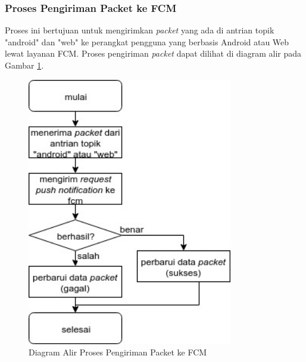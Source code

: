 \subsubsection{Proses Pengiriman Packet ke FCM}
\par Proses ini bertujuan untuk mengirimkan \textit{packet} yang ada di antrian topik "android" dan "web" ke perangkat pengguna yang berbasis Android atau Web lewat layanan FCM. Proses pengiriman \textit{packet} dapat dilihat di diagram alir pada Gambar \ref{flowchart_pengiriman_packet_ke_fcm}.
\begin{figure}[H]
	\centering\includegraphics[width=0.8\textwidth]{bab3/img/flowchart-pengiriman_packet_ke_fcm.jpg}
	\caption{Diagram Alir Proses Pengiriman Packet ke FCM} \label{flowchart_pengiriman_packet_ke_fcm}
\end{figure}

